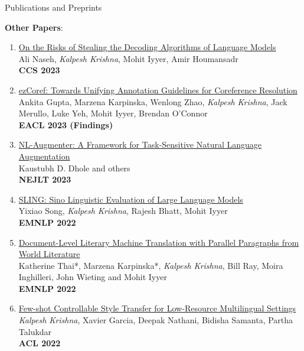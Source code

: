 \documentclass{resume} %
\begin{document}
\begin{rSection}{Publications and Preprints}
\begin{enumerate}[leftmargin=*]
\end{enumerate}

\vspace{0.1in}

\textbf{Other Papers}:
\begin{enumerate}[leftmargin=*]
\setlength\itemsep{0.4em}
\setcounter{enumi}{7}

\item \href{https://arxiv.org/abs/2303.04729}{On the Risks of Stealing the Decoding Algorithms of Language Models} \\
Ali Naseh, \emph{Kalpesh Krishna}, Mohit Iyyer, Amir Houmansadr \\
\textbf{CCS 2023}


\item \href{https://arxiv.org/abs/2210.07188}{ezCoref: Towards Unifying Annotation Guidelines for Coreference Resolution} \\
Ankita Gupta, Marzena Karpinska, Wenlong Zhao, \emph{Kalpesh Krishna}, Jack Merullo, Luke Yeh, Mohit Iyyer, Brendan O'Connor \\
\textbf{EACL 2023 (Findings)}


\item \href{https://arxiv.org/abs/2112.02721}{NL-Augmenter: A Framework for Task-Sensitive Natural Language Augmentation} \\
Kaustubh D. Dhole and others \\
\textbf{NEJLT 2023}

\item \href{https://arxiv.org/abs/2210.11689}{SLING: Sino Linguistic Evaluation of Large Language Models} \\
Yixiao Song, \textit{Kalpesh Krishna}, Rajesh Bhatt, Mohit Iyyer \\
\textbf{EMNLP 2022}

\item \href{https://arxiv.org/abs/2210.14250}{Document-Level Literary Machine Translation with Parallel Paragraphs from World Literature} \\
Katherine Thai*, Marzena Karpinska*, \textit{Kalpesh Krishna}, Bill Ray, Moira Inghilleri, John Wieting and Mohit Iyyer \\
\textbf{EMNLP 2022}


\item \href{https://arxiv.org/abs/2110.07385}{Few-shot Controllable Style Transfer for Low-Resource Multilingual Settings} \\
\textit{Kalpesh Krishna}, Xavier Garcia, Deepak Nathani, Bidisha Samanta, Partha Talukdar \\
\textbf{ACL 2022}


\end{enumerate}
\end{rSection}
\end{document}

